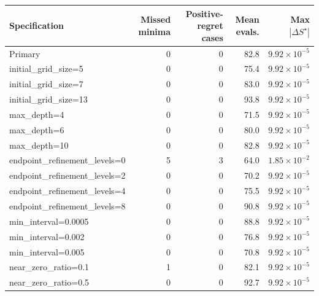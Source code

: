 \begin{tabular}{lrrrr}
\toprule
Specification & Missed minima & Positive-regret cases & Mean evals. & Max $|\Delta S^\star|$ \\
\midrule
Primary & 0 & 0 & 82.8 & $9.92\times 10^{-5}$ \\
initial\_grid\_size=5 & 0 & 0 & 75.4 & $9.92\times 10^{-5}$ \\
initial\_grid\_size=7 & 0 & 0 & 83.0 & $9.92\times 10^{-5}$ \\
initial\_grid\_size=13 & 0 & 0 & 93.8 & $9.92\times 10^{-5}$ \\
max\_depth=4 & 0 & 0 & 71.5 & $9.92\times 10^{-5}$ \\
max\_depth=6 & 0 & 0 & 80.0 & $9.92\times 10^{-5}$ \\
max\_depth=10 & 0 & 0 & 82.8 & $9.92\times 10^{-5}$ \\
endpoint\_refinement\_levels=0 & 5 & 3 & 64.0 & $1.85\times 10^{-2}$ \\
endpoint\_refinement\_levels=2 & 0 & 0 & 70.2 & $9.92\times 10^{-5}$ \\
endpoint\_refinement\_levels=4 & 0 & 0 & 75.5 & $9.92\times 10^{-5}$ \\
endpoint\_refinement\_levels=8 & 0 & 0 & 90.8 & $9.92\times 10^{-5}$ \\
min\_interval=0.0005 & 0 & 0 & 88.8 & $9.92\times 10^{-5}$ \\
min\_interval=0.002 & 0 & 0 & 76.8 & $9.92\times 10^{-5}$ \\
min\_interval=0.005 & 0 & 0 & 70.8 & $9.92\times 10^{-5}$ \\
near\_zero\_ratio=0.1 & 1 & 0 & 82.1 & $9.92\times 10^{-5}$ \\
near\_zero\_ratio=0.5 & 0 & 0 & 92.7 & $9.92\times 10^{-5}$ \\
\bottomrule
\end{tabular}
